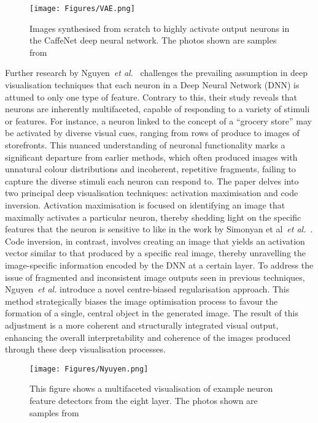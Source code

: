 \begin{figure}[ht!]
	\begin{center}
		\texttt{[image: Figures/VAE.png]}
	\end{center}
	\caption{Images synthesised from scratch to highly activate output neurons in the CaffeNet deep
neural network. The photos shown are samples from~\cite{NguyenDYBC16}}
	\label{Fig:VAE}
\end{figure} 
Further research by Nguyen~\textit{et al.}~\cite{NguyenYC16} challenges the prevailing assumption in deep visualisation techniques that each neuron in a Deep Neural Network (DNN) is attuned to only one type of feature. Contrary to this, their study reveals that neurons are inherently multifaceted, capable of responding to a variety of stimuli or features. For instance, a neuron linked to the concept of a ``grocery store'' may be activated by diverse visual cues, ranging from rows of produce to images of storefronts. This nuanced understanding of neuronal functionality marks a significant departure from earlier methods, which often produced images with unnatural colour distributions and incoherent, repetitive fragments, failing to capture the diverse stimuli each neuron can respond to. The paper delves into two principal deep visualisation techniques: activation maximisation and code inversion. Activation maximisation is focused on identifying an image that maximally activates a particular neuron, thereby shedding light on the specific features that the neuron is sensitive to like in the work by Simonyan et al~\textit{et al.}~\cite{SimonyanVZ13}. Code inversion, in contrast, involves creating an image that yields an activation vector similar to that produced by a specific real image, thereby unravelling the image-specific information encoded by the DNN at a certain layer. To address the issue of fragmented and inconsistent image outputs seen in previous techniques, Nguyen~\textit{et al.} introduce a novel centre-biased regularisation approach. This method strategically biases the image optimisation process to favour the formation of a single, central object in the generated image. The result of this adjustment is a more coherent and structurally integrated visual output, enhancing the overall interpretability and coherence of the images produced through these deep visualisation processes.


\begin{figure}[ht!]
	\begin{center}
		\texttt{[image: Figures/Nyuyen.png]}
	\end{center}
	\caption{This figure shows a multifaceted visualisation of example neuron feature detectors from the eight layer. The photos shown are samples from~\cite{NguyenYC16}}
	\label{Fig:VAE}
\end{figure} 

